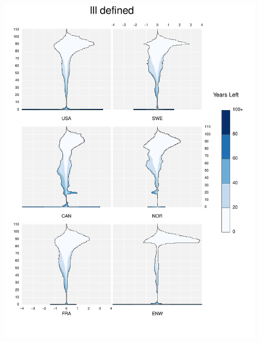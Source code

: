 \documentclass{article}
\begin{document}
\begin{appendices}
\begin{figure}
\includegraphics[scale=.8]{Figures/Causes/DxyIll defined.pdf}
\end{figure}
\begin{figure}
\centering

\end{figure}
\end{appendices}
\end{document}
